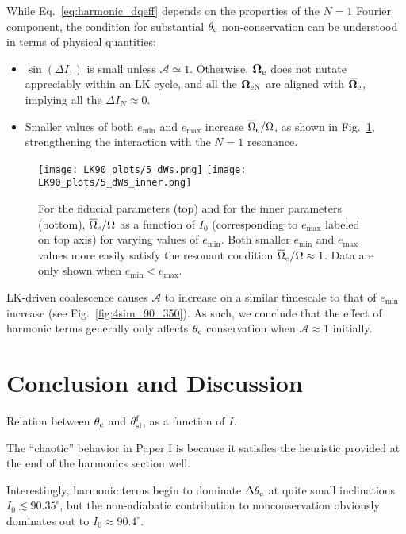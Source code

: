 \documentclass[
        twocolumn,
        twocolappendix
    ]{aastex63}
\renewcommand*{\bm}[1]{\boldsymbol{\mathbf{#1}}}
\newcommand*{\p}[1]{\left(#1\right)}
\begin{document}
While Eq.~\eqref{eq:harmonic_dqeff} depends on the properties of the $N = 1$
Fourier component, the condition for substantial $\theta_{\rm e}$
non-conservation can be understood in terms of physical quantities:
\begin{itemize}
    \item $\sin \p{\Delta I_1}$ is small unless $\mathcal{A} \simeq
        1$. Otherwise, $\bm{\Omega}_{\rm e}$ does not nutate appreciably within
        an LK cycle, and all the $\bm{\Omega}_{\rm eN}$ are aligned with
        $\bm{\overline{\Omega}}_{\rm e}$, implying all the $\Delta I_N \approx
        0$.

    \item Smaller values of both $e_{\min}$ and $e_{\max}$ increase
        $\overline{\Omega}_{\rm e} / \Omega$, as shown in Fig.~\ref{fig:dWs},
        strengthening the interaction with the $N = 1$ resonance.
\end{itemize}
\begin{figure}
    \centering
    \texttt{[image: LK90\_plots/5\_dWs.png]}
    \texttt{[image: LK90\_plots/5\_dWs\_inner.png]}
    \caption{For the fiducial parameters (top) and for the inner parameters
    (bottom), $\overline{\Omega}_{\rm e} / \Omega$ as a function of $I_0$
    (corresponding to $e_{\max}$ labeled on top axis) for varying values of
    $e_{\min}$. Both smaller $e_{\min}$ and $e_{\max}$ values more easily
    satisfy the resonant condition $\overline{\Omega}_{\rm e} / \Omega \approx
    1$. Data are only shown when $e_{\min} < e_{\max}$.}\label{fig:dWs}
\end{figure}

LK-driven coalescence causes $\mathcal{A}$ to increase on a similar
timescale to that of $e_{\min}$ increase (see Fig.~\ref{fig:4sim_90_350}). As
such, we conclude that the effect of harmonic terms generally only affects
$\theta_{\rm e}$ conservation when $\mathcal{A} \approx 1$ initially.

\section{Conclusion and Discussion}\label{s:discussion}

Relation between $\theta_{\rm e}$ and $\theta_{\rm sl}^{\rm f}$, as a function
of $I$.

The ``chaotic'' behavior in Paper I is because it satisfies the heuristic
provided at the end of the harmonics section well.

Interestingly, harmonic terms begin to dominate $\Delta \theta_{\rm e}$ at quite
small inclinations $I_0 \lesssim 90.35^\circ$, but the non-adiabatic
contribution to nonconservation obviously dominates out to $I_0 \approx
90.4^\circ$.



\end{document}
